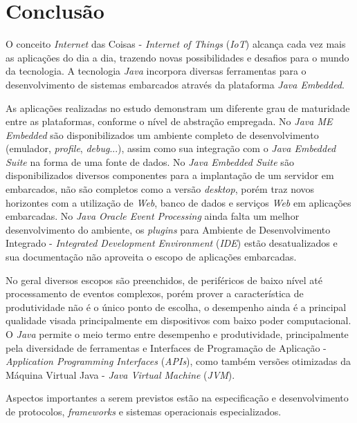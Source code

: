 %

\chapter{Conclusão}

O conceito \textit{Internet} das Coisas - \textit{Internet of Things}
(\textit{IoT}) alcança cada vez mais as aplicações do dia a dia, trazendo novas
possibilidades e desafios para o mundo da tecnologia.  A tecnologia
\textit{Java} incorpora diversas ferramentas para o desenvolvimento de sistemas
embarcados através da plataforma \textit{Java Embedded}.

As aplicações realizadas no estudo demonstram um diferente grau de maturidade
entre as plataformas, conforme o nível de abstração empregada.  No \textit{Java
    ME Embedded} são disponibilizados um ambiente completo de desenvolvimento
(emulador, \textit{profile}, \textit{debug}...), assim como sua integração com
o \textit{Java Embedded Suite} na forma de uma fonte de dados.  No \textit{Java
    Embedded Suite} são disponibilizados diversos componentes para a
implantação de um servidor em embarcados, não são completos como a versão
\textit{desktop}, porém traz novos horizontes com a utilização de \textit{Web},
banco de dados e serviços \textit{Web} em aplicações embarcadas.  No
\textit{Java Oracle Event Processing} ainda falta um melhor desenvolvimento do
ambiente, os \textit{plugins} para Ambiente de Desenvolvimento Integrado -
\textit{Integrated Development Environment} (\textit{IDE}) estão desatualizados
e sua documentação não aproveita o escopo de aplicações embarcadas.

No geral diversos escopos são preenchidos, de periféricos de baixo nível até
processamento de eventos complexos, porém prover a característica de
produtividade não é o único ponto de escolha, o desempenho ainda é a principal
qualidade visada principalmente em dispositivos com baixo poder computacional.
O \textit{Java} permite o meio termo entre desempenho e produtividade,
principalmente pela diversidade de ferramentas e Interfaces de Programação de
Aplicação - \textit{Application Programming Interfaces} (\textit{APIs}), como
também versões otimizadas da Máquina Virtual Java - \textit{Java Virtual
    Machine} (\textit{JVM}).

Aspectos importantes a serem previstos estão na especificação e desenvolvimento
de protocolos, \textit{frameworks} e sistemas operacionais especializados.
